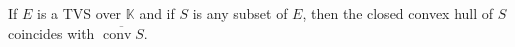 If $E$ is a TVS over $\mathbb{K}$ and if $S$ is any subset of $E$, then the closed convex hull of $S$ coincides with $\overline{\operatorname{conv} S}$.